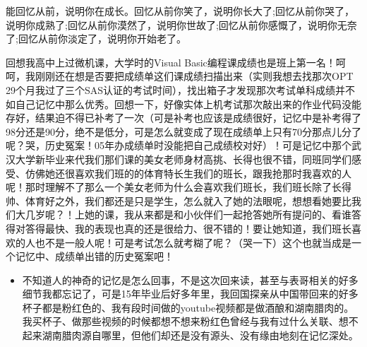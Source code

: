 \documentclass[9pt, b5paper]{article}
\begin{document}
能回忆从前，说明你在成长。回忆从前你笑了，说明你长大了;回忆从前你哭了，说明你成熟了;回忆从前你漠然了，说明你世故了;回忆从前你感慨了，说明你无奈了;回忆从前你淡定了，说明你开始老了。

回想我高中上过微机课，大学时的Visual Basic编程课成绩也是班上第一名！呵呵，我刚刚还在想是否要把成绩单这们课成绩扫描出来（实则我想去找那次OPT 29个月我过了三个SAS认证的考试时间），找出箱子才发现那次考试单科成绩并不如自己记忆中那么优秀。回想一下，好像实体上机考试那次敲出来的作业代码没能存好，结果迫不得已补考了一次（可是补考也应该是成绩很好，记忆中是补考得了98分还是90分，绝不是低分，可是怎么就变成了现在成绩单上只有70分那点儿分了呢？哭，历史冤案！05年办成绩单时没能把自己成绩校对好）！可是记忆中那个武汉大学新毕业来代我们那们课的美女老师身材高挑、长得也很不错，同班同学们感受、仿佛她还很喜欢我们班的的体育特长生我们的班长，跟我抢那时我喜欢的人呢！那时理解不了那么一个美女老师为什么会喜欢我们班长，我们班长除了长得帅、体育好之外，我们都还是只是学生，怎么就入了她的法眼呢，想想看她要比我们大几岁呢？！上她的课，我从来都是和小伙伴们一起抢答她所有提问的、看谁答得对答得最快、我的表现也真的还是很给力、很不错的！要让她知道，我们班长喜欢的人也不是一般人呢！可是考试怎么就考糊了呢？（哭一下）这个也就当成是一个记忆中、成绩单出错的历史冤案吧！

\begin{itemize}
\item 不知道人的神奇的记忆是怎么回事，不是这次回来读，甚至与表哥相关的好多细节我都忘记了，可是15年毕业后好多年里，我回国探亲从中国带回来的好多杯子都是粉红色的、我有段时间做的youtube视频都是做酒酿和湖南腊肉的。我买杯子、做那些视频的时候都想不想来粉红色曾经与我有过什么关联、想不起来湖南腊肉源自哪里，但他们却还是没有源头、没有缘由地刻在记忆深处。
\end{itemize}
\end{document}
